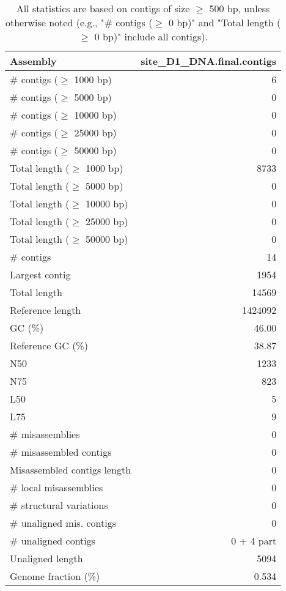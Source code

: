 \documentclass[12pt,a4paper]{article}
\begin{document}
\begin{table}[ht]
\begin{center}
\caption{All statistics are based on contigs of size $\geq$ 500 bp, unless otherwise noted (e.g., "\# contigs ($\geq$ 0 bp)" and "Total length ($\geq$ 0 bp)" include all contigs).}
\begin{tabular}{|l*{1}{|r}|}
\hline
Assembly & site\_D1\_DNA.final.contigs \\ \hline
\# contigs ($\geq$ 1000 bp) & 6 \\ \hline
\# contigs ($\geq$ 5000 bp) & 0 \\ \hline
\# contigs ($\geq$ 10000 bp) & 0 \\ \hline
\# contigs ($\geq$ 25000 bp) & 0 \\ \hline
\# contigs ($\geq$ 50000 bp) & 0 \\ \hline
Total length ($\geq$ 1000 bp) & 8733 \\ \hline
Total length ($\geq$ 5000 bp) & 0 \\ \hline
Total length ($\geq$ 10000 bp) & 0 \\ \hline
Total length ($\geq$ 25000 bp) & 0 \\ \hline
Total length ($\geq$ 50000 bp) & 0 \\ \hline
\# contigs & 14 \\ \hline
Largest contig & 1954 \\ \hline
Total length & 14569 \\ \hline
Reference length & 1424092 \\ \hline
GC (\%) & 46.00 \\ \hline
Reference GC (\%) & 38.87 \\ \hline
N50 & 1233 \\ \hline
N75 & 823 \\ \hline
L50 & 5 \\ \hline
L75 & 9 \\ \hline
\# misassemblies & 0 \\ \hline
\# misassembled contigs & 0 \\ \hline
Misassembled contigs length & 0 \\ \hline
\# local misassemblies & 0 \\ \hline
\# structural variations & 0 \\ \hline
\# unaligned mis. contigs & 0 \\ \hline
\# unaligned contigs & 0 + 4 part \\ \hline
Unaligned length & 5094 \\ \hline
Genome fraction (\%) & 0.534 \\ \hline

\end{tabular}
\end{center}
\end{table}
\end{document}
